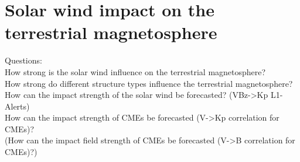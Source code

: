
\chapter{Solar wind impact on the terrestrial magnetosphere}


Questions:\\
	How strong is the solar wind influence on the terrestrial magnetosphere?\\
	How strong do different structure types influence the terrestrial magnetosphere?\\
	
	How can the impact strength of the solar wind be forecasted? (VBz->Kp L1-Alerts)\\
	How can the impact strength of CMEs be forecasted (V->Kp correlation for CMEs)?\\
	(How can the impact field strength of CMEs be forecasted (V->B correlation for CMEs)?)\\




